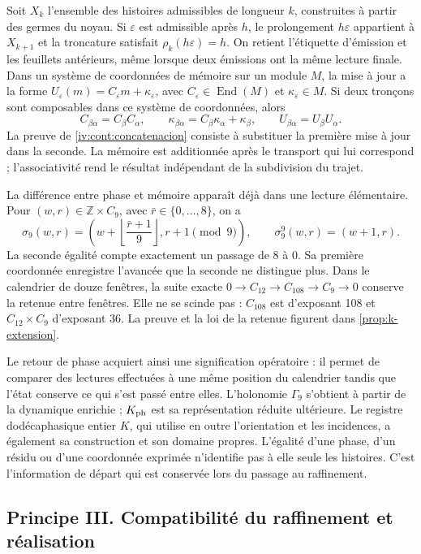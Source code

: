 Soit \(X_k\) l’ensemble des histoires admissibles de longueur \(k\),
construites à partir des germes du noyau. Si \(\varepsilon\) est admissible
après \(h\), le prolongement \(h\varepsilon\) appartient à \(X_{k+1}\)
et la troncature satisfait \(\rho_k(h\varepsilon)=h\). On retient
l’étiquette d’émission et les feuillets antérieurs, même lorsque deux émissions
ont la même lecture finale. Dans un système de coordonnées de mémoire sur un module
\(M\), la mise à jour a la forme
\(U_\varepsilon(m)=C_\varepsilon m+\kappa_\varepsilon\), avec
\(C_\varepsilon\in\operatorname{End}(M)\) et
\(\kappa_\varepsilon\in M\). Si deux tronçons sont composables dans ce
système de coordonnées, alors
\[
 C_{\beta\alpha}=C_\beta C_\alpha,\qquad
 \kappa_{\beta\alpha}=C_\beta\kappa_\alpha+\kappa_\beta,
 \qquad U_{\beta\alpha}=U_\beta U_\alpha.
\]
La preuve de \cref{iv:cont:concatenacion} consiste à substituer la première mise à jour dans la seconde. La mémoire est additionnée après le transport qui lui correspond ; l'associativité rend le résultat indépendant de la subdivision du trajet.

La différence entre phase et mémoire apparaît déjà dans une lecture élémentaire.
Pour \((w,r)\in\mathbb Z\times C_9\), avec
\(\bar r\in\{0,\ldots,8\}\), on a
\[
 \sigma_9(w,r)=
 \left(w+\left\lfloor\frac{\bar r+1}{9}\right\rfloor,
       r+1\pmod9\right),\qquad
 \sigma_9^9(w,r)=(w+1,r).
\]
La seconde égalité compte exactement un passage de 8 à 0. Sa première coordonnée enregistre l'avancée que la seconde ne distingue plus. Dans le calendrier de douze fenêtres, la suite exacte \(0\to C_{12}\to C_{108}\to C_9\to0\) conserve la retenue entre fenêtres. Elle ne se scinde pas : \(C_{108}\) est d'exposant 108 et \(C_{12}\times C_9\) d'exposant 36. La preuve et la loi de la retenue figurent dans \cref{prop:k-extension}.

Le retour de phase acquiert ainsi une signification opératoire : il permet de
comparer des lectures effectuées à une même position du calendrier tandis que
l’état conserve ce qui s’est passé entre elles. L’holonomie \(\Gamma_9\)
s’obtient à partir de la dynamique enrichie ; \(K_{\rm ph}\) est sa représentation
réduite ultérieure. Le registre dodécaphasique entier \(K\), qui utilise
en outre l’orientation et les incidences, a également sa construction et son domaine
propres. L’égalité d’une phase, d’un résidu ou d’une coordonnée exprimée
n’identifie pas à elle seule les histoires. C’est l’information de départ
qui est conservée lors du passage au raffinement.

\subsection*{Principe III. Compatibilité du raffinement et réalisation}
\hypertarget{prinh:refinamiento}{}

